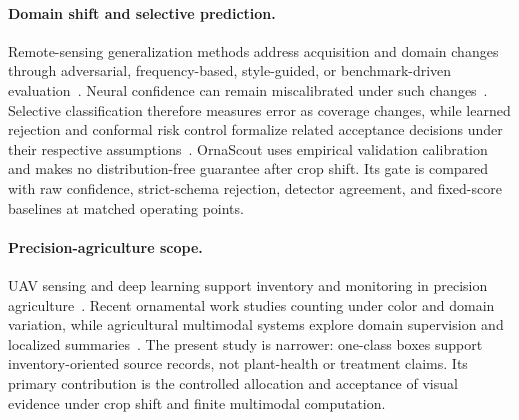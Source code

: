 \paragraph{Domain shift and selective prediction.}
Remote-sensing generalization methods address acquisition and domain changes through adversarial, frequency-based, style-guided, or benchmark-driven evaluation~\cite{ganin2016dann,wang2023uav,alemadi2025shift,danish2024dg,talemi2025stylepro}. Neural confidence can remain miscalibrated under such changes~\cite{guo2017calibration}. Selective classification therefore measures error as coverage changes, while learned rejection and conformal risk control formalize related acceptance decisions under their respective assumptions~\cite{geifman2017selective,geifman2019selectivenet,angelopoulos2024crc}. OrnaScout uses empirical validation calibration and makes no distribution-free guarantee after crop shift. Its gate is compared with raw confidence, strict-schema rejection, detector agreement, and fixed-score baselines at matched operating points.

\paragraph{Precision-agriculture scope.}
UAV sensing and deep learning support inventory and monitoring in precision agriculture~\cite{zhang2012uav,osco2021precision}. Recent ornamental work studies counting under color and domain variation, while agricultural multimodal systems explore domain supervision and localized summaries~\cite{manjunatha2026beyondgreen,awais2025agrogpt,sundaravadivel2026rosai}. The present study is narrower: one-class boxes support inventory-oriented source records, not plant-health or treatment claims. Its primary contribution is the controlled allocation and acceptance of visual evidence under crop shift and finite multimodal computation.
